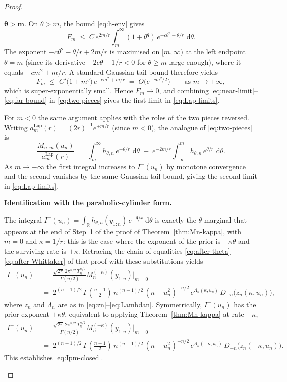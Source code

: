 \documentclass[numsec,webpdf,modern,medium,namedate]{oup-authoring-template}
\theoremstyle{thmstyleone}%
\theoremstyle{thmstyletwo}%
\theoremstyle{thmstylethree}%
\newcommand{\dd}{\,\mathrm{d}}
\newcommand{\Lap}{\mathrm{Lap}}
\newcommand{\1}{\mathbf{1}}
\begin{document}
\begin{proof}
\begin{enumerate}
$\mathbf{\theta > m}$. \quad
On $\theta > m$, the bound \eqref{eq:h-env} gives
\[
  F_m \;\leq\; C\,e^{2m/r}\!\int_m^\infty (1+\theta^q)\,
  e^{-c\theta^2-\theta/r}\,\dd\theta.
\]
The exponent $-c\theta^2-\theta/r+2m/r$ is maximised on $[m,\infty)$ at
the left endpoint $\theta = m$ (since its derivative
$-2c\theta - 1/r < 0$ for $\theta\geq m$ large enough), where it equals
$-cm^2+m/r$. A standard Gaussian-tail bound therefore yields
\begin{equation}\label{eq:far-bound}
  F_m \;\leq\; C'\bigl(1+m^q\bigr)\,e^{-cm^2+m/r}
  \;=\; O\!\bigl(e^{-cm^2/2}\bigr)
  \qquad\text{as }m\to+\infty,
\end{equation}
which is super-exponentially small. Hence $F_m\to 0$, and combining
\eqref{eq:near-limit}--\eqref{eq:far-bound} in \eqref{eq:two-pieces}
gives the first limit in \eqref{eq:Lap-limits}.

For $m<0$ the same argument applies with the roles of the two pieces reversed. Writing $a_m^{\Lap}(r) = (2r)^{-1}e^{+m/r}$ (since $m<0$),
the analogue of \eqref{eq:two-pieces} is
\[
  \frac{M_{n,m}(u_n)}{a_m^{\Lap}(r)}
  \;=\;\int_m^\infty h_{\theta,n}\,e^{-\theta/r}\,\dd\theta
  \;+\;e^{-2m/r}\int_{-\infty}^m h_{\theta,n}\,e^{\theta/r}\,\dd\theta.
\]
As $m\to-\infty$ the first integral increases to $I^-(u_n)$ by monotone
convergence and the second vanishes by the same Gaussian-tail bound,
giving the second limit in \eqref{eq:Lap-limits}.

\textbf{Identification with the parabolic-cylinder form.} 

The integral $I^-(u_n) = \int_\mathbb{R} h_{\theta,n}(y_{1:n})\,e^{-\theta/r}\,
\dd\theta$ is exactly the $\theta$-marginal that appears at the end of
Step~1 of the proof of Theorem~\ref{thm:Mn-kappa}, with $m=0$ and
$\kappa = 1/r$: this is the case where the exponent of the prior is
$-\kappa\theta$ and the surviving rate is $+\kappa$. Retracing the
chain of equalities \eqref{eq:after-theta}--\eqref{eq:after-Whittaker}
of that proof with these substitutions yields
\begin{align*}
  I^-(u_n)
  &  \;=\; \frac{\sqrt{2\pi} \, 2\pi^{n/2} \, T_n^{n/2} }{\Gamma(n/2)} M_n^{(+\kappa)}(y_{1:n})\big|_{m=0} \\
  & \;=\;2^{(n+1)/2} \, \Gamma \left( \frac{n+1}{2}\right) \, n^{(n-1)/2} \, (n-u_n^2)^{-n/2} \,
  e^{\Lambda_n(\kappa,u_n)}\,
  D_{-n}\!\bigl(z_n(\kappa,u_n)\bigr)
  ,
\end{align*}
where $z_n$ and $\Lambda_n$ are as in
\eqref{eq:zn}--\eqref{eq:Lambdan}. Symmetrically, $I^+(u_n)$ has the
prior exponent $+\kappa\theta$, equivalent to applying
Theorem~\ref{thm:Mn-kappa} at rate $-\kappa$,
\begin{align*}
  I^+(u_n)
  & \;=\; \frac{\sqrt{2\pi} \, 2\pi^{n/2} \, T_n^{n/2} }{\Gamma(n/2)} M_n^{(-\kappa)}(y_{1:n})\big|_{m=0}\\
  & \;=\; 2^{(n+1)/2} \, \Gamma \left( \frac{n+1}{2}\right) \, n^{(n-1)/2} \, (n-u_n^2)^{-n/2} \, 
  e^{\Lambda_n(-\kappa,u_n)}\,
  D_{-n}\!\bigl(z_n(-\kappa,u_n)\bigr).
\end{align*}
This establishes \eqref{eq:Ipm-closed}.


\end{enumerate}
\end{proof}
\end{document}
